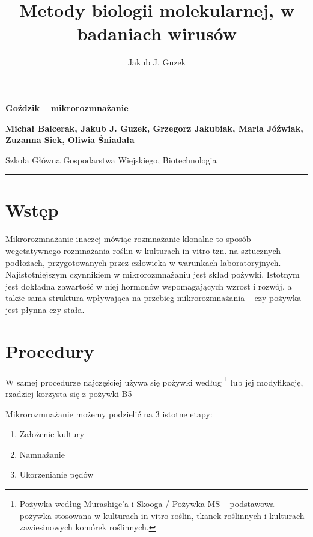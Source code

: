 \documentclass[two column, twoside, a4paper]{article}
\title{Metody biologii molekularnej, w badaniach wirusów}
\author{Jakub J. Guzek}
\date{}
\begin{document}
\begin{strip}
{\sc \bfseries \huge {}\selectfont Goździk -- mikrorozmnażanie} \vspace{\baselineskip}

{\bfseries \large Michał Balcerak, Jakub J. Guzek, Grzegorz Jakubiak, Maria Jóźwiak, Zuzanna Siek, Oliwia Śniadała}

{Szkoła Główna Gospodarstwa Wiejskiego, Biotechnologia}\vspace{\baselineskip}

\hrule
\end{strip}

\section{Wstęp}

Mikrorozmnażanie inaczej mówiąc rozmnażanie klonalne to sposób wegetatywnego rozmnażania roślin w kulturach in vitro tzn. na sztucznych podłożach, przygotowanych przez człowieka w warunkach laboratoryjnych. Najistotniejszym czynnikiem w mikrorozmnażaniu jest skład pożywki. Istotnym jest dokładna zawartość w niej hormonów wspomagających wzrost i rozwój, a także sama struktura wpływająca na przebieg mikrorozmnażania – czy pożywka jest płynna czy stała.

\section{Procedury}

W samej procedurze najczęściej używa się pożywki według \autocite{Murashige1962}\footnote{Pożywka według Murashige’a i Skooga / Pożywka MS – podstawowa pożywka stosowana w kulturach in vitro roślin, tkanek roślinnych i kulturach zawiesinowych komórek roślinnych.} lub jej modyfikację, rzadziej korzysta się z pożywki B5 \autocite{Gamborg1968}

Mikrorozmnażanie możemy podzielić na 3 istotne etapy:
\begin{enumerate}
	\item Założenie kultury
	\item Namnażanie
	\item Ukorzenianie pędów
\end{enumerate}
\end{document}
